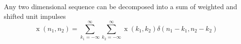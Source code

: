 Any two dimensional sequence can be decomposed into a sum of weighted and shifted unit impulses
$$\operatorname{x}(n_1, n_2) = \sum\limits_{k_1 = - \infty}^{\infty} \sum\limits_{k_2 = - \infty}^{\infty} \operatorname{x}(k_1, k_2) \delta(n_1 - k_1, n_2 - k_2)$$
